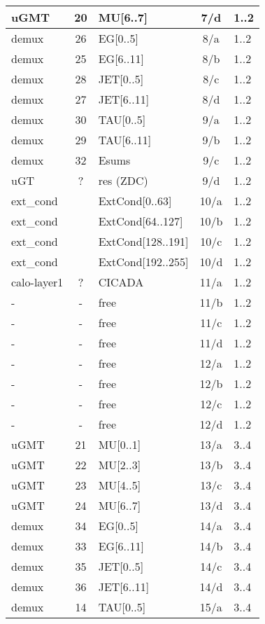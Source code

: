 \begin{longtable}{|l|c|l|c|l|}
uGMT  & 20  & MU[6..7]   & 7/d  & 1..2 \\\hline
demux & 26  & EG[0..5]   & 8/a  & 1..2 \\\hline
demux & 25  & EG[6..11]  & 8/b  & 1..2 \\\hline
demux & 28  & JET[0..5]  & 8/c  & 1..2 \\\hline
demux & 27  & JET[6..11] & 8/d  & 1..2 \\\hline
demux & 30  & TAU[0..5]  & 9/a  & 1..2 \\\hline
demux & 29  & TAU[6..11] & 9/b  & 1..2 \\\hline
demux & 32  & Esums      & 9/c  & 1..2 \\\hline
uGT   & ?   & res (ZDC)  & 9/d  & 1..2 \\\hline
ext\_cond &     & ExtCond[0..63]    & 10/a & 1..2 \\\hline
ext\_cond &     & ExtCond[64..127]  & 10/b & 1..2 \\\hline
ext\_cond &     & ExtCond[128..191] & 10/c & 1..2 \\\hline
ext\_cond &     & ExtCond[192..255] & 10/d & 1..2 \\\hline
calo-layer1 & ? & CICADA & 11/a & 1..2 \\\hline
- & - & free & 11/b & 1..2 \\\hline
- & - & free & 11/c & 1..2 \\\hline
- & - & free & 11/d & 1..2 \\\hline
- & - & free & 12/a & 1..2 \\\hline
- & - & free & 12/b & 1..2 \\\hline
- & - & free & 12/c & 1..2 \\\hline
- & - & free & 12/d & 1..2 \\\hline
\hline
uGMT  & 21  & MU[0..1]   & 13/a & 3..4 \\\hline
uGMT  & 22  & MU[2..3]   & 13/b & 3..4 \\\hline
uGMT  & 23  & MU[4..5]   & 13/c & 3..4 \\\hline
uGMT  & 24  & MU[6..7]   & 13/d & 3..4 \\\hline
demux & 34  & EG[0..5]   & 14/a & 3..4 \\\hline
demux & 33  & EG[6..11]  & 14/b & 3..4 \\\hline
demux & 35  & JET[0..5]  & 14/c & 3..4 \\\hline
demux & 36  & JET[6..11] & 14/d & 3..4 \\\hline
demux & 14  & TAU[0..5]  & 15/a & 3..4 \\\hline

\end{longtable}

